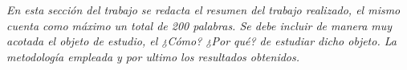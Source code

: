 \textit{En esta sección del trabajo se redacta el resumen del trabajo realizado, el mismo cuenta como máximo un total de 200 palabras. Se debe incluir de manera muy acotada el objeto de estudio, el ¿Cómo? ¿Por qué? de estudiar dicho objeto. La metodología empleada y por ultimo los resultados obtenidos.}\\
